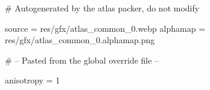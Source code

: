 # Autogenerated by the atlas packer, do not modify

source = res/gfx/atlas_common_0.webp
alphamap = res/gfx/atlas_common_0.alphamap.png

# -- Pasted from the global override file --

anisotropy = 1
